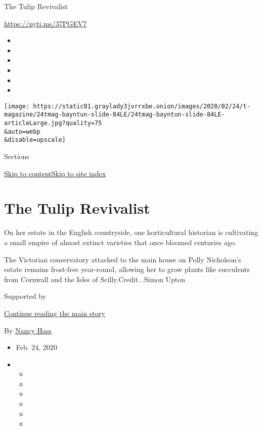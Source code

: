 The Tulip Revivalist

\url{https://nyti.ms/37PGEV7}

\begin{itemize}
\item
\item
\item
\item
\item
\item
\end{itemize}

\texttt{[image: https://static01.graylady3jvrrxbe.onion/images/2020/02/24/t-magazine/24tmag-bayntun-slide-84LE/24tmag-bayntun-slide-84LE-articleLarge.jpg?quality=75\\\&auto=webp\\\&disable=upscale]}

Sections

\protect\hyperlink{site-content}{Skip to
content}\protect\hyperlink{site-index}{Skip to site index}

\hypertarget{the-tulip-revivalist}{%
\section{The Tulip Revivalist}\label{the-tulip-revivalist}}

On her estate in the English countryside, one horticultural historian is
cultivating a small empire of almost extinct varieties that once bloomed
centuries ago.

The Victorian conservatory attached to the main house on Polly
Nicholson's estate remains frost-free year-round, allowing her to grow
plants like succulents from Cornwall and the Isles of
Scilly.Credit...Simon Upton

Supported by

\protect\hyperlink{after-sponsor}{Continue reading the main story}

By \href{https://www.nytimes3xbfgragh.onion/by/nancy-hass}{Nancy Hass}

\begin{itemize}
\item
  Feb. 24, 2020
\item
  \begin{itemize}
  \item
  \item
  \item
  \item
  \item
  \item
  \end{itemize}
\end{itemize}


